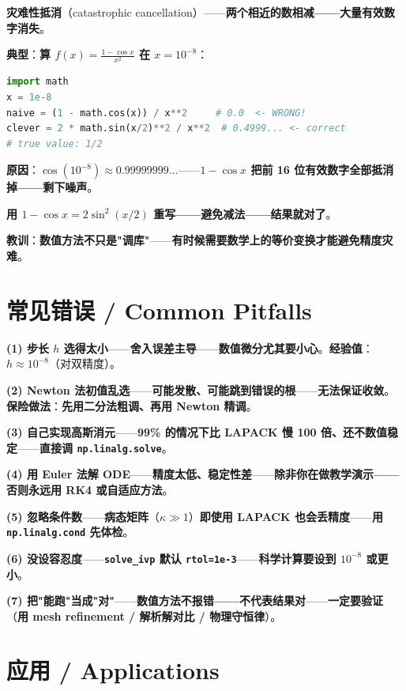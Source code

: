 \textbf{灾难性抵消}（catastrophic cancellation）——\textbf{两个相近的数相减——大量有效数字消失}。

\textbf{典型}：\textbf{算 $f(x) = \frac{1 - \cos x}{x^2}$ 在 $x = 10^{-8}$}：

\begin{lstlisting}[language=Python]
import math
x = 1e-8
naive = (1 - math.cos(x)) / x**2     # 0.0  <- WRONG!
clever = 2 * math.sin(x/2)**2 / x**2  # 0.4999... <- correct
# true value: 1/2
\end{lstlisting}

\textbf{原因}：\textbf{$\cos(10^{-8}) \approx 0.99999999\ldots$}——\textbf{$1 - \cos x$ 把前 16 位有效数字全部抵消掉——剩下噪声}。

\textbf{用 $1 - \cos x = 2 \sin^2(x/2)$ 重写——避免减法——结果就对了}。

\textbf{教训}：\textbf{数值方法不只是"调库"}——\textbf{有时候需要数学上的等价变换才能避免精度灾难}。

\section{常见错误 / Common Pitfalls}

\textbf{(1) 步长 $h$ 选得太小}——\textbf{舍入误差主导}——\textbf{数值微分尤其要小心}。\textbf{经验值}：$h \approx 10^{-8}$（对双精度）。

\textbf{(2) Newton 法初值乱选}——\textbf{可能发散、可能跳到错误的根}——\textbf{无法保证收敛}。\textbf{保险做法}：\textbf{先用二分法粗调、再用 Newton 精调}。

\textbf{(3) 自己实现高斯消元}——\textbf{99\% 的情况下比 LAPACK 慢 100 倍、还不数值稳定}——\textbf{直接调 \texttt{np.linalg.solve}}。

\textbf{(4) 用 Euler 法解 ODE}——\textbf{精度太低、稳定性差}——\textbf{除非你在做教学演示——否则永远用 RK4 或自适应方法}。

\textbf{(5) 忽略条件数}——\textbf{病态矩阵}（$\kappa \gg 1$）\textbf{即使用 LAPACK 也会丢精度}——\textbf{用 \texttt{np.linalg.cond} 先体检}。

\textbf{(6) 没设容忍度}——\textbf{\texttt{solve\_ivp} 默认 \texttt{rtol=1e-3}}——\textbf{科学计算要设到 $10^{-8}$ 或更小}。

\textbf{(7) 把"能跑"当成"对"}——\textbf{数值方法不报错——不代表结果对}——\textbf{一定要验证}（\textbf{用 mesh refinement / 解析解对比 / 物理守恒律}）。

\section{应用 / Applications}

